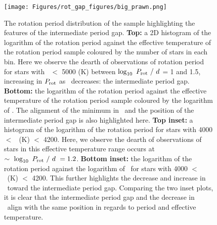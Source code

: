 \begin{figure}
\centering
 \texttt{[image: Figures/rot\_gap\_figures/big\_prawn.png]}
 \caption[The rotation period distribution of the \citep{mcquillan_rotation_2014} sample highlighting the features of the intermediate period gap.]{The rotation period distribution of the \citep{mcquillan_rotation_2014} sample highlighting the features of the intermediate period gap. \textbf{Top:} a 2D histogram of the logarithm of the rotation period against the effective temperature of the rotation period sample coloured by the number of stars in each bin. Here we observe the dearth of observations of rotation period for stars with \teff \ $<$ 5000 (K) between $\log_{10} \ P_{\rm{rot}}\ / \ d$ = 1 and 1.5, increasing in $P_{\rm{rot}}$ as \teff \ decreases: the intermediate period gap. \textbf{Bottom:} the logarithm of the rotation period against the effective temperature of the rotation period sample coloured by the logarithm of \rper{}. The alignment of the minimum in \rper\ and the position of the intermediate period gap is also highlighted here.  
 \textbf{Top inset:} a histogram of the logarithm of the rotation period for stars with 4000 $<$ \teff \ (K) $<$ 4200. Here, we observe the dearth of observations of stars in this effective temperature range occurs at $\sim \ \log_{10} \ P_{\rm{rot}}\ / \ d \ = 1.2$. 
 \textbf{Bottom inset:} the logarithm of the rotation period against the logarithm of \rper \ for stars with 4000 $<$ \teff \ (K) $<$ 4200. This further highlights the decrease and increase in \rper \ toward the intermediate period gap. Comparing the two inset plots, it is clear that the intermediate period gap and the decrease in \rper \ align with the same position in regards to period and effective temperature.}
 \label{fig:big_prawn}
\end{figure}


